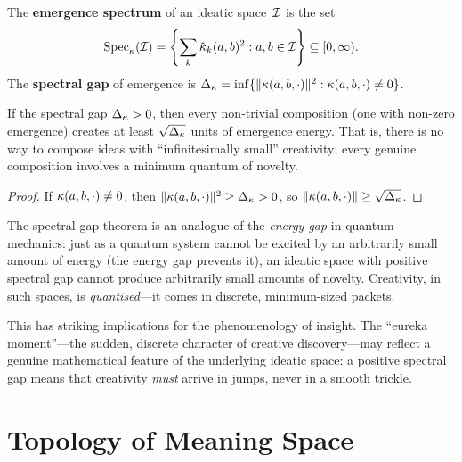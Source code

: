 \begin{definition}
\label{def:emergence-spectrum}
The \textbf{emergence spectrum} of an ideatic space~$\mathcal{I}$ is the set
\[
  \mathrm{Spec}_{\kappa}(\mathcal{I}) = \left\{
    \sum_k \hat{\kappa}_k(a,b)^2 : a, b \in \mathcal{I}
  \right\} \subseteq [0, \infty).
\]
The \textbf{spectral gap} of emergence is
$\Delta_{\kappa} = \inf\{\|\kappa(a,b,\cdot)\|^2 :
\kappa(a,b,\cdot) \neq 0\}$.
\end{definition}

\begin{theorem}
\label{thm:spectral-gap}
If the spectral gap $\Delta_{\kappa} > 0$, then every non-trivial
composition (one with non-zero emergence) creates at least
$\sqrt{\Delta_{\kappa}}$ units of emergence energy.  That is,
there is no way to compose ideas with ``infinitesimally small''
creativity; every genuine composition involves a minimum quantum
of novelty.
\end{theorem}

\begin{proof}
If $\kappa(a,b,\cdot) \neq 0$, then $\|\kappa(a,b,\cdot)\|^2
\ge \Delta_{\kappa} > 0$, so $\|\kappa(a,b,\cdot)\| \ge
\sqrt{\Delta_{\kappa}}$.
\end{proof}

\begin{interpretation}
The spectral gap theorem is an analogue of the \emph{energy gap} in
quantum mechanics: just as a quantum system cannot be excited by
an arbitrarily small amount of energy (the energy gap prevents it),
an ideatic space with positive spectral gap cannot produce
arbitrarily small amounts of novelty.  Creativity, in such spaces,
is \emph{quantised}---it comes in discrete, minimum-sized packets.

This has striking implications for the phenomenology of insight.
The ``eureka moment''---the sudden, discrete character of creative
discovery---may reflect a genuine mathematical feature of the
underlying ideatic space: a positive spectral gap means that
creativity \emph{must} arrive in jumps, never in a smooth trickle.
\end{interpretation}




\chapter{Topology of Meaning Space}
\label{ch:topology}

